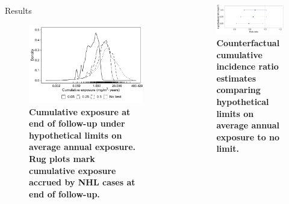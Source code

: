 \documentclass[final]{beamer}
\newlength{\sepwid}
\newlength{\onecolwid}
\begin{document}
\begin{frame}[t]
\begin{columns}[t,onlytextwidth,totalwidth=\onecolwid]
\begin{column}{\onecolwid}
\begin{block}{Results}
\begin{figure}
\caption{\bfseries Cumulative exposure at end of follow-up under hypothetical limits on average annual exposure. Rug plots mark cumulative exposure accrued by NHL cases at end of follow-up.}
\includegraphics[width=0.87\linewidth]{../../../resources/shift-soluble.pdf}
\end{figure}

\end{block}

\end{column} %

\begin{column}{\sepwid}\end{column}

\begin{column}{\onecolwid}

\begin{figure}
\caption{\bfseries Counterfactual cumulative incidence ratio estimates comparing hypothetical limits on average annual exposure to no limit.}
\includegraphics[width=0.87\linewidth]{resources/rr.pdf}
\end{figure}


\end{column}
\end{columns}
\end{frame}
\end{document}
